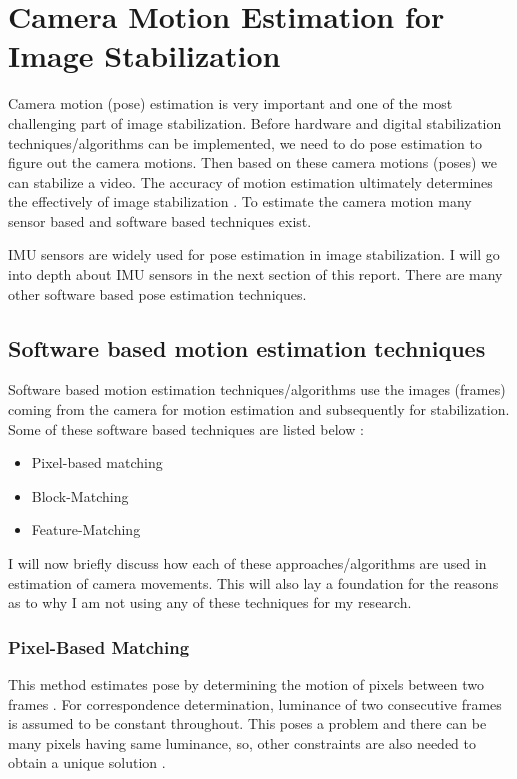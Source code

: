 \section{Camera Motion Estimation for Image Stabilization}
Camera motion (pose) estimation is very important and one of the most challenging part of image stabilization. Before hardware and digital stabilization techniques/algorithms can be implemented, we need to do pose estimation to figure out the camera motions. Then based on these camera motions (poses) we can stabilize a video. The accuracy of motion estimation ultimately determines the effectively of image stabilization \citep{ryu2012robust}. To estimate the camera motion many sensor based and software based techniques exist. 

IMU sensors are widely used for pose estimation in image stabilization. I will go into depth about IMU sensors in the next section of this report. There are many other software based pose estimation techniques. 

\subsection{Software based motion estimation techniques}

Software based motion estimation techniques/algorithms use the images (frames) coming from the camera for motion estimation and subsequently for stabilization. Some of these software based techniques are listed below \citep{dis_review}:

\begin{itemize}
\item Pixel-based matching
\item Block-Matching
\item Feature-Matching
\end{itemize}

I will now briefly discuss how each of these approaches/algorithms are used in estimation of camera movements. This will also lay a foundation for the reasons as to why I am not using any of these techniques for my research.

\subsubsection{Pixel-Based Matching}
This method estimates pose by determining the motion of pixels between two frames \citep{dis_review}. For correspondence determination, luminance of two consecutive frames is assumed to be constant throughout. This poses a problem and there can be many pixels having same luminance, so, other constraints are also needed to obtain a unique solution \citep{dis_review}. 

